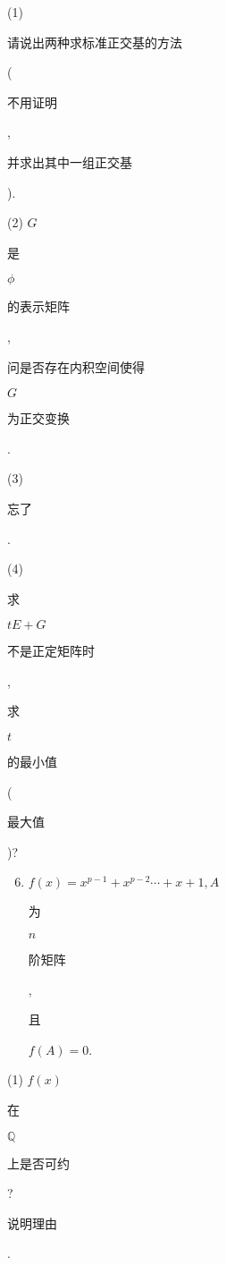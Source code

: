 \documentclass[10pt]{article}
\begin{document}
(1) \begin{CJK}{UTF8}{mj}请说出两种求标准正交基的方法\end{CJK} (\begin{CJK}{UTF8}{mj}不用证明\end{CJK}, \begin{CJK}{UTF8}{mj}并求出其中一组正交基\end{CJK}).

(2) $G$ \begin{CJK}{UTF8}{mj}是\end{CJK} $\phi$ \begin{CJK}{UTF8}{mj}的表示矩阵\end{CJK}, \begin{CJK}{UTF8}{mj}问是否存在内积空间使得\end{CJK} $G$ \begin{CJK}{UTF8}{mj}为正交变换\end{CJK}.

(3) \begin{CJK}{UTF8}{mj}忘了\end{CJK}.

(4) \begin{CJK}{UTF8}{mj}求\end{CJK} $t E+G$ \begin{CJK}{UTF8}{mj}不是正定矩阵时\end{CJK}, \begin{CJK}{UTF8}{mj}求\end{CJK} $t$ \begin{CJK}{UTF8}{mj}的最小值\end{CJK} (\begin{CJK}{UTF8}{mj}最大值\end{CJK})?

\begin{enumerate}
  \setcounter{enumi}{5}
  \item $f(x)=x^{p-1}+x^{p-2} \cdots+x+1, A$ \begin{CJK}{UTF8}{mj}为\end{CJK} $n$ \begin{CJK}{UTF8}{mj}阶矩阵\end{CJK}, \begin{CJK}{UTF8}{mj}且\end{CJK} $f(A)=0$.
\end{enumerate}
(1) $f(x)$ \begin{CJK}{UTF8}{mj}在\end{CJK} $\mathbb{Q}$ \begin{CJK}{UTF8}{mj}上是否可约\end{CJK}? \begin{CJK}{UTF8}{mj}说明理由\end{CJK}.
\end{document}
